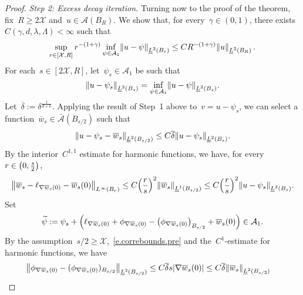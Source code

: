\documentclass[11pt,twoside]{article} %
\numberwithin{equation}{section}
\theoremstyle{definition}
\let\originalleft\left
\let\originalright\right
\renewcommand{\left}{\mathopen{}\mathclose\bgroup\originalleft}
\renewcommand{\right}{\aftergroup\egroup\originalright}
\renewcommand*{\tilde}{\widetilde}
\newcommand{\X}{\mathcal{X}}
\newcommand{\A}{\mathcal{A}}
\newcommand{\Ahom}{\bar{\A}}
\begin{document}
\begin{proof}
\emph{Step 2: Excess decay iteration.}
Turning now to the proof of the theorem, fix~$R \geq 2\X$ and~$u\in \mathcal{A}(B_R)$. We show that, for every~$\gamma\in (0,1)$, there exists~$C(\gamma,d,\lambda,\Lambda)<\infty$ such that 
\begin{equation}
\label{e.excessdecaygiveth}
\sup_{r \in [\X,R]}
r^{-(1+\gamma)} \inf_{\psi \in \A_1}\left\| u - \psi \right\|_{\underline{L}^2(B_{r})}
\leq 
C R^{-(1+\gamma)} \left\| u \right\|_{\underline{L}^2(B_{R})}\,.
\end{equation}
For each~$s\in [2\X,R]$, let~$\psi_s\in \A_1$ be such that
\begin{equation*}
\left\| u - \psi_s  \right\|_{\underline{L}^2(B_s)} 
=
\inf_{\psi\in \A_1} \left\| u - \psi \right\|_{\underline{L}^2(B_s)} .
\end{equation*}
Let~$\overline{\delta}:= \delta^{\frac1{d+6}}$.  Applying the result of Step~1 above to~$v = u - \psi_s$, 
we can select a function~$\overline{w}_s \in \Ahom(B_{s/2})$ such that 
\begin{equation*}
\left\| u - \psi_s - \overline{w}_s \right\|_{\underline{L}^2(B_{s/2})}
\leq 
C\overline{\delta} \left\| u - \psi_s \right\|_{\underline{L}^2(B_{s})}.
\end{equation*}
By the interior~$C^{1,1}$ estimate for harmonic functions, we have, for every~$r\in \left(0,\tfrac s2\right)$,
\begin{equation*}
\left\| \overline{w}_s - \ell_{\nabla \overline{w}_s(0)} -  \overline{w}_s(0) \right\|_{L^\infty(B_r)} 
\leq 
C \left( \frac rs \right)^2 \left\| \overline{w}_s \right\|_{\underline{L}^1(B_{s/2})} 
\leq 
C \left( \frac rs \right)^2
\left\| u - \psi_s \right\|_{\underline{L}^2(B_{s})}.
\end{equation*}
Set
\begin{equation*}
\tilde{\psi}:= \psi_s + \left( \ell_{\nabla \overline{w}_s(0)} + \phi_{\nabla \overline{w}_s(0)} - \left( \phi_{\nabla \overline{w}_s(0)} \right)_{B_{s/2}} 
+ \overline{w}_s(0) \right) \in \A_1.
\end{equation*}
By the assumption~$s/2 \geq \X$,~\eqref{e.correbounds.pre} and the~$C^1$-estimate for harmonic functions, we have  
\begin{align*}
\bigl\| \phi_{\nabla \overline{w}_s(0)}  - ( \phi_{\nabla \overline{w}_s(0)} )_{B_{s/2}} 
\bigr\|_{\underline{L}^2(B_{s/2})}
\leq C\overline{\delta} s \left| \nabla \overline{w}_s(0) \right| 
&
\leq C\overline{\delta} \left\| \overline{w}_s \right\|_{\underline{L}^2(B_{s/2})} 

\end{align*}
\end{proof}
\end{document}
